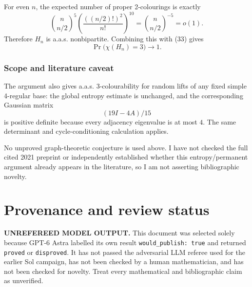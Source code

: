 \documentclass[
  11pt,
  a4paper,
]{article}
\begin{document}
For even \(n\), the expected number of proper 2-colourings is exactly \[
\binom{n}{n/2}^{5}
 \left(\frac{((n/2)!)^2}{n!}\right)^{10}
 =\binom{n}{n/2}^{-5}=o(1).
\] Therefore \(H_n\) is a.a.s. nonbipartite. Combining this with (33)
gives \[
\boxed{\Pr\bigl(\chi(H_n)=3\bigr)\longrightarrow1.}
\]

\subsubsection{Scope and literature
caveat}\label{scope-and-literature-caveat}

The argument also gives a.a.s. 3-colourability for random lifts of any
fixed simple 4-regular base: the global entropy estimate is unchanged,
and the corresponding Gaussian matrix \[
(19I-4A)/15
\] is positive definite because every adjacency eigenvalue is at most
\(4\). The same determinant and cycle-conditioning calculation applies.

No unproved graph-theoretic conjecture is used above. I have not checked
the full cited 2021 preprint or independently established whether this
entropy/permanent argument already appears in the literature, so I am
not asserting bibliographic novelty.

\appendix

\section{Provenance and review
status}\label{provenance-and-review-status}

\begin{warning}

\textbf{UNREFEREED MODEL OUTPUT.} This document was selected solely
because GPT-6 Astra labelled its own result
\texttt{would\_publish:\ true} and returned \texttt{proved} or
\texttt{disproved}. It has not passed the adversarial LLM referee used
for the earlier Sol campaign, has not been checked by a human
mathematician, and has not been checked for novelty. Treat every
mathematical and bibliographic claim as unverified.

\end{warning}
\end{document}
